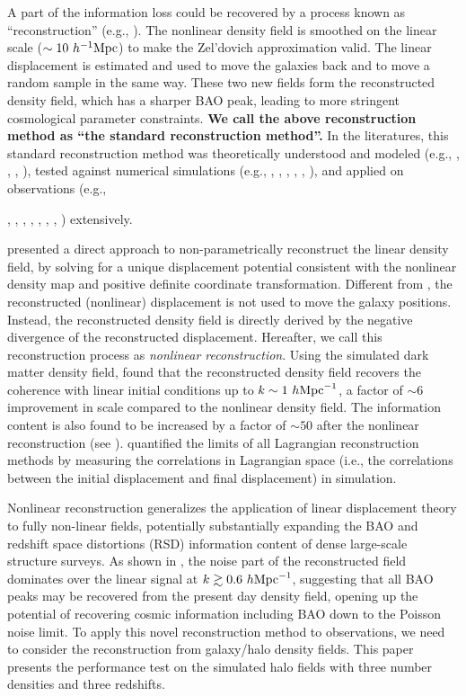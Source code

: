 \documentclass[iop]{emulateapj}
\newcommand{\mpch}{h^{-1} {\rm Mpc}}
\newcommand{\hmpc}{h {\rm Mpc}^{-1}}
\begin{document}
A part of the information loss could be recovered by a process known as ``reconstruction'' (e.g., \citet{Eisenstein07}).
The nonlinear density field is smoothed on the linear scale ($\sim 10\ \mpch$) to make the Zel'dovich approximation valid.
The linear displacement is estimated and used to move the galaxies back and to move a random sample in the same way.
These two new fields form the reconstructed density field,
which has a sharper BAO peak, leading to more stringent cosmological parameter constraints.
{\bf We call the above reconstruction method as ``the standard reconstruction method''.}
In the literatures, this standard reconstruction method was theoretically understood and modeled (e.g., \cite{Padmanabhan09}, \cite{Noh09}, \cite{White15}, \cite{Seo16}), tested against numerical simulations (e.g., \cite{Seo08}, \cite{Seo10}, \cite{Mehta11}, \cite{Achitouv15}, \cite{Schmittfull15}, \cite{Obuljen16}), and applied on observations (e.g., {\cite{Padmanabhan12}, \cite{xuxy13}, \cite{Anderson14}, \cite{Kazin14}, \cite{Ross15}, \cite{Beutler16}, \cite{Hinton17}, \cite{Beutler17}) extensively.

\citet{zhuhm16c} presented a direct approach to non-parametrically reconstruct the linear density field,
by solving for a unique displacement potential consistent with the nonlinear density map and positive definite coordinate transformation.
Different from \citet{Eisenstein07}, the reconstructed (nonlinear) displacement is not used to move the galaxy positions.
Instead, the reconstructed density field is directly derived by the negative divergence of the reconstructed displacement.
Hereafter, we call this reconstruction process as {\it nonlinear reconstruction}.
Using the simulated dark matter density field, \citet{zhuhm16c} found that the reconstructed density field recovers the coherence with linear initial conditions up to $k\sim 1\ \hmpc$, a factor of $\sim 6$ improvement in scale compared to the nonlinear density field.
The information content is also found to be increased by a factor of $\sim 50$ after the nonlinear reconstruction (see \citet{panqy16}).
\cite{yuhr16} quantified the limits of all Lagrangian reconstruction methods by measuring the correlations in Lagrangian space (i.e., the correlations between the initial displacement and final displacement) in simulation.

Nonlinear reconstruction generalizes the application of linear displacement theory to fully non-linear fields, potentially substantially expanding the BAO and redshift space distortions (RSD) information content of dense large-scale structure surveys.
As shown in \citet{zhuhm16c}, the noise part of the reconstructed field dominates over the linear signal at $k\gtrsim0.6\ \hmpc$, suggesting that all BAO peaks may be recovered from the present day density field, opening up the potential of recovering cosmic information including BAO down to the Poisson noise limit.
To apply this novel reconstruction method to observations, we need to consider the reconstruction from galaxy/halo density fields. 
This paper presents the performance test on the simulated halo fields with three number densities and three redshifts.

}
\end{document}
